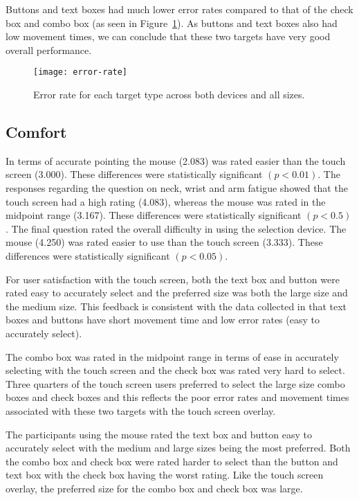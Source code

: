 \documentclass{elsart}
\begin{document}
Buttons and text boxes had much lower error rates compared to that of
the check box and combo box (as seen in Figure~\ref{fig-error-rate}). As
buttons and text boxes also had low movement times, we can conclude that
these two targets have very good overall performance.

\begin{figure}
	\centering
	\texttt{[image: error-rate]}
	\caption{Error rate for each target type across both devices and all
	sizes.}
	\label{fig-error-rate}
\end{figure}


\subsection{Comfort}
\label{sec-results-comfort}

In terms of accurate pointing the mouse (2.083) was rated easier than
the touch screen (3.000). These differences were statistically
significant \((p < 0.01)\). The responses regarding the question on
neck, wrist and arm fatigue showed that the touch screen had a high
rating (4.083), whereas the mouse was rated in the midpoint range
(3.167). These differences were statistically significant \((p < 0.5)\).
The final question rated the overall difficulty in using the selection
device. The mouse (4.250) was rated easier to use than the touch screen
(3.333). These differences were statistically significant \((p <
0.05)\).

For user satisfaction with the touch screen, both the text box and
button were rated easy to accurately select and the preferred size was
both the large size and the medium size. This feedback is consistent
with the data collected in that text boxes and buttons have short
movement time and low error rates (easy to accurately select).

The combo box was rated in the midpoint range in terms of ease in
accurately selecting with the touch screen and the check box was rated
very hard to select. Three quarters of the touch screen users preferred
to select the large size combo boxes and check boxes and this reflects
the poor error rates and movement times associated with these two
targets with the touch screen overlay.

The participants using the mouse rated the text box and button easy to
accurately select with the medium and large sizes being the most
preferred. Both the combo box and check box were rated harder to select
than the button and text box with the check box having the worst rating.
Like the touch screen overlay, the preferred size for the combo box and
check box was large.
\end{document}
